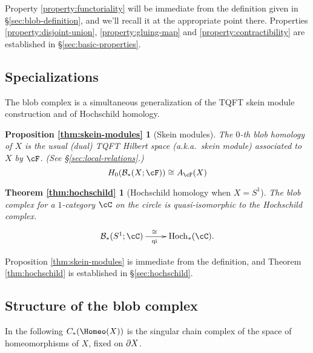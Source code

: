 Property \ref{property:functoriality} will be immediate from the definition given in
\S \ref{sec:blob-definition}, and we'll recall it at the appropriate point there.
Properties \ref{property:disjoint-union}, \ref{property:gluing-map} and 
\ref{property:contractibility} are established in \S \ref{sec:basic-properties}.

\subsection{Specializations}
\label{sec:specializations}

The blob complex is a simultaneous generalization of the TQFT skein module construction and of Hochschild homology.

\newtheorem*{thm:skein-modules}{Proposition \ref{thm:skein-modules}}

\begin{thm:skein-modules}[Skein modules]
The $0$-th blob homology of $X$ is the usual 
(dual) TQFT Hilbert space (a.k.a.\ skein module) associated to $X$
by $\cF$.
(See \S \ref{sec:local-relations}.)
\begin{equation*}
H_0(\bc_*(X;\cF)) \iso A_{\cF}(X)
\end{equation*}
\end{thm:skein-modules}

\newtheorem*{thm:hochschild}{Theorem \ref{thm:hochschild}}

\begin{thm:hochschild}[Hochschild homology when $X=S^1$]
The blob complex for a $1$-category $\cC$ on the circle is
quasi-isomorphic to the Hochschild complex.
\begin{equation*}
\xymatrix{\bc_*(S^1;\cC) \ar[r]^(0.47){\iso}_(0.47){\text{qi}} & \HC_*(\cC).}
\end{equation*}
\end{thm:hochschild}

Proposition \ref{thm:skein-modules} is immediate from the definition, and
Theorem \ref{thm:hochschild} is established in \S \ref{sec:hochschild}.


\subsection{Structure of the blob complex}
\label{sec:structure}

In the following $\CH{X}$ is the singular chain complex of the space of homeomorphisms of $X$, fixed on $\partial X$.

